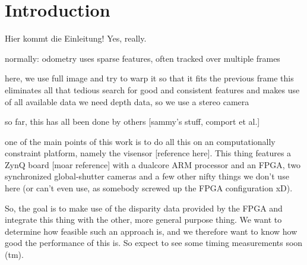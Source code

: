 \chapter{Introduction}
\label{sec:introduction}

Hier kommt die Einleitung! Yes, really.

normally: odometry uses sparse features, often tracked over multiple frames

here, we use full image and try to warp it so that it fits the previous frame
this eliminates all that tedious search for good and consistent features and
makes use of all available data we need depth data, so we use a stereo camera

so far, this has all been done by others [sammy's stuff, comport et al.]

one of the main points of this work is to do all this on an computationally
constraint platform, namely the visensor [reference here]. This thing features
a ZynQ board [moar reference] with a dualcore ARM processor and an FPGA, two
synchronized global-shutter cameras and a few other nifty things we don't use
here (or can't even use, as somebody screwed up the FPGA configuration xD).

So, the goal is to make use of the disparity data provided by the FPGA and
integrate this thing with the other, more general purpose thing. We want to
determine how feasible such an approach is, and we therefore want to know how
good the performance of this is. So expect to see some timing measurements soon
(tm).
